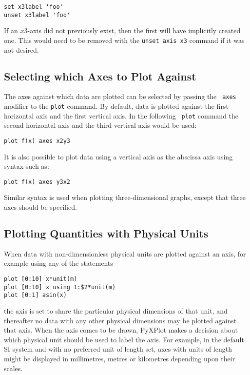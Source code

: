 \begin{verbatim}
set x3label 'foo'
unset x3label 'foo'
\end{verbatim}

\noindent If an $x3$-axis did not previously exist, then the first will have
implicitly created one. This would need to be removed with the {\tt unset axis
x3} command if it was not desired.

\subsection{Selecting which Axes to Plot Against}

The axes against which data are plotted can be selected by passing the {\tt
axes} modifier to the {\tt plot} command. By default, data is plotted against
the first horizontal axis and the first vertical axis. In the following {\tt
plot} command the second horizontal axis and the third vertical axis would be
used:
\begin{verbatim}
plot f(x) axes x2y3
\end{verbatim}
It is also possible to plot data using a vertical axis as the abscissa axis
using syntax such as:
\begin{verbatim}
plot f(x) axes y3x2
\end{verbatim}
Similar syntax is used when plotting three-dimensional graphs, except that
three axes should be specified.

\subsection{Plotting Quantities with Physical Units}
\label{sec:set_axisunitstyle}

When data with non-dimensionless physical units are plotted against an axis,
for example using any of the statements
\begin{verbatim}
plot [0:10] x*unit(m)
plot [0:10] x using 1:$2*unit(m)
plot [0:1] asin(x)
\end{verbatim}
the axis is set to share the particular physical dimensions of that unit, and
thereafter no data with any other physical dimensions may be plotted against
that axis. When the axis comes to be drawn, PyXPlot makes a decision about
which physical unit should be used to label the axis. For example, in the
default SI system and with no preferred unit of length set, axes with units of
length might be displayed in millimetres, metres or kilometres depending upon
their scales.

